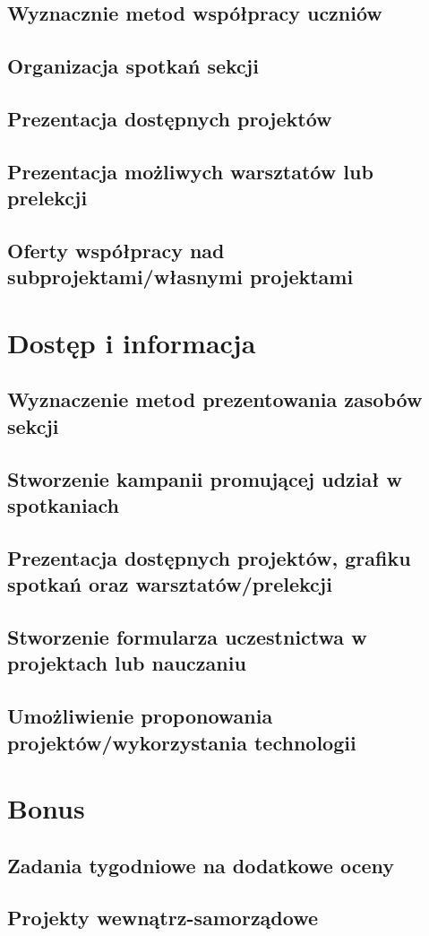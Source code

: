 \documentclass[9pt,a4paper]{report}
\begin{document}
\section{Wyznacznie metod współpracy uczniów}
\section{Organizacja spotkań sekcji}
\section{Prezentacja dostępnych projektów}
\section{Prezentacja możliwych warsztatów lub prelekcji}
\section{Oferty współpracy nad subprojektami/własnymi projektami}

\chapter{Dostęp i informacja}

\section{Wyznaczenie metod prezentowania zasobów sekcji}
\section{Stworzenie kampanii promującej udział w spotkaniach}
\section{Prezentacja dostępnych projektów, grafiku spotkań oraz warsztatów/prelekcji}
\section{Stworzenie formularza uczestnictwa w projektach lub nauczaniu}
\section{Umożliwienie proponowania projektów/wykorzystania technologii}

\chapter{Bonus}

\section{Zadania tygodniowe na dodatkowe oceny}
\section{Projekty wewnątrz-samorządowe}
\end{document}
